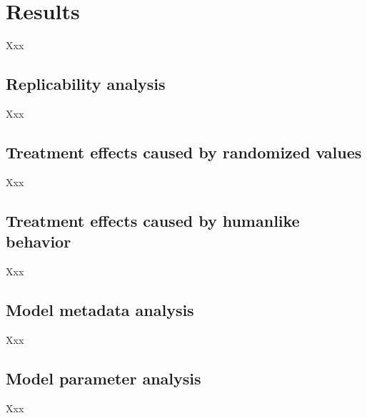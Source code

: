\section{Results}
Xxx

\subsection{Replicability analysis}
Xxx

\subsection{Treatment effects caused by randomized values}
Xxx

\subsection{Treatment effects caused by humanlike behavior}
Xxx

\subsection{Model metadata analysis}
Xxx

\subsection{Model parameter analysis}
Xxx